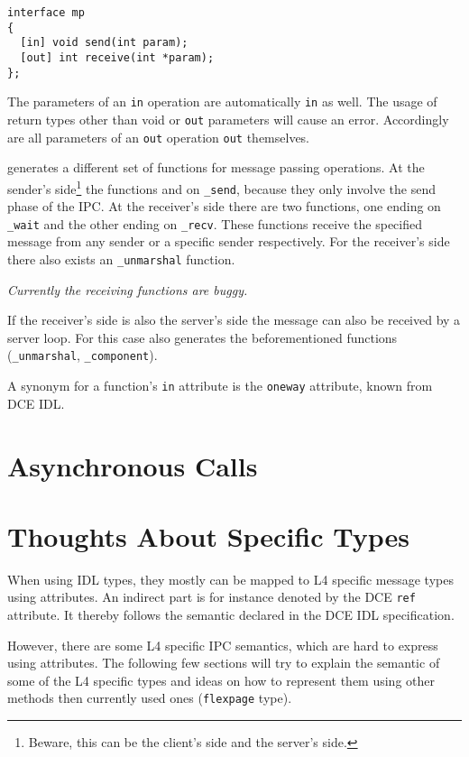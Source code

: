 \begin{verbatim}
interface mp
{
  [in] void send(int param);
  [out] int receive(int *param);
};
\end{verbatim}

The parameters of an \verb|in| operation are automatically \verb|in| as
well. The usage of return types other than void or \verb|out| parameters
will cause an error. Accordingly are all parameters of an \verb|out|
operation \verb|out| themselves.

\dice{} generates a different set of functions for message passing
operations. At the sender's side\footnote{Beware, this can be the client's
side and the server's side.} the functions and on \verb|_send|, because
they only involve the send phase of the IPC. At the receiver's side
there are two functions, one ending on \verb|_wait| and the other ending
on \verb|_recv|. These functions receive the specified message from
any sender or a specific sender respectively. For the receiver's side
there also exists an \verb|_unmarshal| function.

{\em Currently the receiving functions are buggy.}

If the receiver's side is also the server's side the message
can also be received by a server loop. For this case \dice{} also
generates the beforementioned functions (\verb|_unmarshal|, 
\verb|_component|). 

A synonym for a function's \verb|in| attribute is the \verb|oneway|
attribute, known from DCE IDL.

\section{Asynchronous Calls}
\label{sec:asynchronous}

\section{Thoughts About \dice{} Specific Types}
When using IDL types, they mostly can be mapped to L4 specific 
message types using attributes. An indirect part is for 
instance denoted by the DCE \verb|ref| attribute. It thereby
follows the semantic declared in the DCE IDL specification.

However, there are some L4 specific IPC semantics, which
are hard to express using attributes. The following few
sections will try to explain the semantic of some of the L4
specific types and ideas on how to represent them using other 
methods then currently used ones ({\tt flexpage} type).

